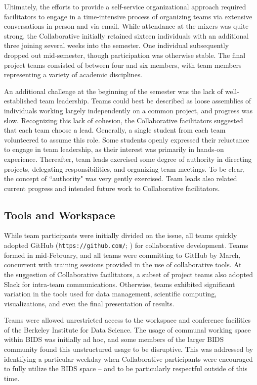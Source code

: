 \documentclass[12pt]{article}
\begin{document}
Ultimately, the efforts to provide a self-service organizational approach required facilitators to engage in a time-intensive process of organizing teams via extensive conversations in person and via email. While attendance at the mixers was quite strong, the Collaborative initially retained sixteen individuals with an additional three joining several weeks into the semester. One individual subsequently dropped out mid-semester, though participation was otherwise stable.  The final project teams consisted of between four and six members, with team members representing a variety of academic disciplines.  

An additional challenge at the beginning of the semester was the lack of well-established team leadership. Teams could best be described as loose assemblies of individuals working largely independently on a common project, and progress was slow. Recognizing this lack of cohesion, the Collaborative facilitators suggested that each team choose a lead.  Generally, a single student from each team volunteered to assume this role. Some students openly expressed their reluctance to engage in team leadership, as their interest was primarily in hands-on experience.  Thereafter, team leads exercised some degree of authority in directing projects, delegating responsibilities, and organizing team meetings.  To be clear, the concept of ``authority" was very gently exercised.  Team leads also related current progress and intended future work to Collaborative facilitators.

\subsection{Tools and Workspace}

While team participants were initially divided on the issue, all teams quickly adopted GitHub (\texttt{https://github.com/}; \cite{dabbish2012social}) for collaborative development.  Teams formed in mid-February, and all teams were committing to GitHub by March, concurrent with training sessions provided in the use of collaborative tools.  At the suggestion of Collaborative facilitators, a subset of project teams also adopted Slack for intra-team communications.  Otherwise, teams exhibited significant variation in the tools used for data management, scientific computing, visualizations, and even the final presentation of results.

Teams were allowed unrestricted access to the workspace and conference facilities of the Berkeley Institute for Data Science.  The usage of communal working space within BIDS was initially ad hoc, and some members of the larger BIDS community found this unstructured usage to be disruptive. This was addressed by identifying a particular weekday when Collaborative participants were encouraged to fully utilize the BIDS space -- and to be particularly respectful outside of this time.
\end{document}
